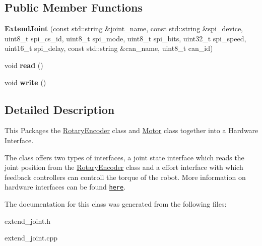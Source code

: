 \subsection*{Public Member Functions}
\begin{DoxyCompactItemize}
\item 
{\bfseries Extend\+Joint} (const std\+::string \&joint\+\_\+name, const std\+::string \&spi\+\_\+device, uint8\+\_\+t spi\+\_\+cs\+\_\+id, uint8\+\_\+t spi\+\_\+mode, uint8\+\_\+t spi\+\_\+bits, uint32\+\_\+t spi\+\_\+speed, uint16\+\_\+t spi\+\_\+delay, const std\+::string \&can\+\_\+name, uint8\+\_\+t can\+\_\+id)\hypertarget{classExtendJoint_a115a7b5763d4496e9c365614241b2351}{}\label{classExtendJoint_a115a7b5763d4496e9c365614241b2351}

\item 
void {\bfseries read} ()\hypertarget{classExtendJoint_a703426ab8a4047bb7a6087ffff734b5d}{}\label{classExtendJoint_a703426ab8a4047bb7a6087ffff734b5d}

\item 
void {\bfseries write} ()\hypertarget{classExtendJoint_aaaddc50f230254a001ce8b3f56064371}{}\label{classExtendJoint_aaaddc50f230254a001ce8b3f56064371}

\end{DoxyCompactItemize}


\subsection{Detailed Description}
This Packages the \hyperlink{classRotaryEncoder}{Rotary\+Encoder} class and \hyperlink{classMotor}{Motor} class together into a Hardware Interface. 

The class offers two types of interfaces, a joint state interface which reads the joint position from the \hyperlink{classRotaryEncoder}{Rotary\+Encoder} class and a effort interface with which feedback controllers can controll the torque of the robot. More information on hardware interfaces can be found \href{http://wiki.ros.org/ros_control#Hardware_Interfaces}{\tt here}. 

The documentation for this class was generated from the following files\+:\begin{DoxyCompactItemize}
\item 
extend\+\_\+joint.\+h\item 
extend\+\_\+joint.\+cpp\end{DoxyCompactItemize}
